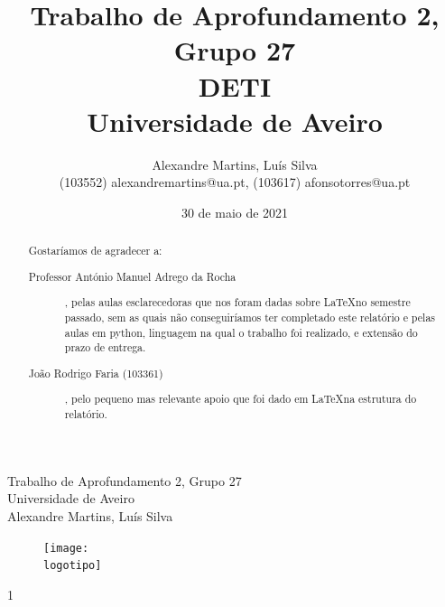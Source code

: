 \documentclass{report}
\begin{document}
%
\def\titulo{Trabalho de Aprofundamento 2, Grupo 27}
\def\data{30 de maio de 2021}
\def\autores{Alexandre Martins, Luís Silva}
\def\autorescontactos{(103552) alexandremartins@ua.pt, (103617) afonsotorres@ua.pt}
\def\versao{1}
\def\departamento{DETI}
\def\empresa{Universidade de Aveiro}
\def\logotipo{ua.pdf}
%
%
\begin{titlepage}

\begin{center}
%
\vspace*{50mm}
%
{\Huge \titulo}\\ 
%
\vspace{10mm}
%
{\Large \empresa}\\
%
\vspace{10mm}
%
{\LARGE \autores}\\ 
%
\vspace{30mm}
%
\begin{figure}[h]
\center
\texttt{[image: \\logotipo]}
\end{figure}%
\vspace{30mm}
\end{center}
%
\begin{flushright}
\versao
\end{flushright}
\end{titlepage}

\title{%
{\Huge\textbf{\titulo}}\\
{\Large \departamento\\ \empresa}
}
%
\author{%
    \autores \\
    \autorescontactos
}
%
\date{\data}
%
\maketitle


\renewcommand{\abstractname}{Agradecimentos}
\begin{abstract}
Gostaríamos de agradecer a: 

\begin{description}
	\item[Professor António Manuel Adrego da Rocha], pelas aulas esclarecedoras que nos foram dadas sobre \LaTeX no semestre passado, sem as quais não conseguiríamos ter completado este relatório e pelas aulas em python, linguagem na qual o trabalho foi realizado, e extensão do prazo de entrega.
	
		\item[João Rodrigo Faria (103361)], pelo pequeno mas relevante apoio que foi dado em \LaTeX na estrutura do relatório. 
	

	
	
	
\end{description}
\end{abstract}
\end{document}
